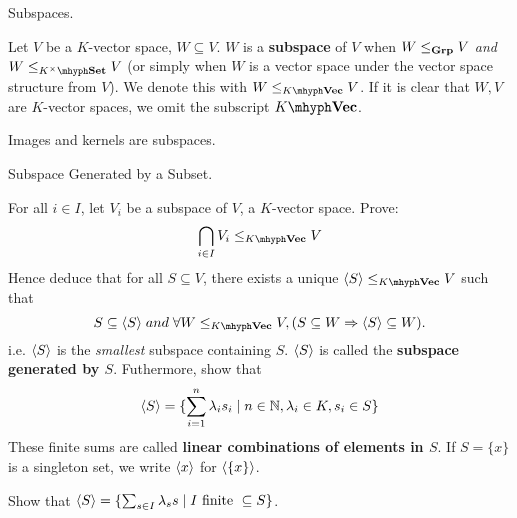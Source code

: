 \documentclass[../book.tex]{subfiles}
\begin{document}
\begin{dfn} Subspaces. 

    Let $V$ be a $K$-vector space, $W \subseteq V$.
    $W$ is a \textbf{subspace} of $V$ when 
    $W \leq_{\mathbf{Grp}} V$ \emph{and} $W \leq_{K^\times\mhyph\Set} V$
    (or simply when $W$ is a vector space
    under the vector space structure from $V$).
    We denote this with $W \leq_{\KVec} V$. 
    If it is clear that $W, V$ are $K$-vector spaces,
    we omit the subscript $\KVec$. 
    
\end{dfn}
\begin{eg}
    Images and kernels are subspaces.
\end{eg}
\begin{ex} Subspace Generated by a Subset. 

    For all $i \in I$, let $V_i$ be a subspace of $V$, a $K$-vector space. 
    Prove: 
    \[\bigcap_{i \in I} V_i \leq_{\KVec} V\] 
    Hence deduce that for all $S \subseteq V$, there exists a unique $\< S\> \leq_{\KVec} V$ such that
    \[
        S \subseteq \< S \> \;and\;
        \forall W \leq_{\KVec} V, (S \subseteq W \imp \< S \> \subseteq W). 
    \]
    i.e. $\langle S \rangle$ is the \emph{smallest} subspace containing $S$. 
    $\langle S \rangle$ is called the \textbf{subspace generated by $S$}. 
    Futhermore, show that 
    \[\langle S \rangle = \{\sum_{i = 1}^n \lambda_i s_i \mid n \in \mathbb{N}, \lambda_i \in K, s_i \in S\}\]
    These finite sums are called \textbf{linear combinations of elements in $S$}.
    If $S = \{x\}$ is a singleton set, 
    we write $\langle x \rangle$ for $\langle \{x\} \rangle$. 
    
    Show that $\langle S\rangle = \{\sum_{s\in I} \lambda_s s \mid I \text{ finite }\subseteq S \}$.
\end{ex}
\end{document}
